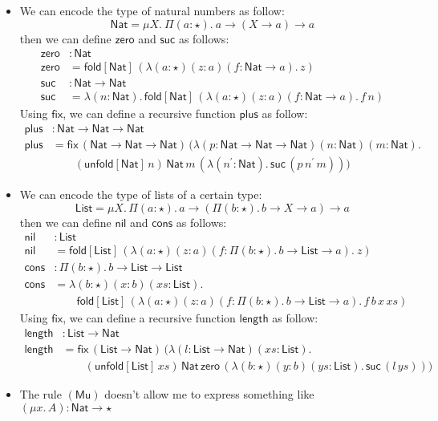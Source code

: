 \documentclass[oneside,a4paper]{article}
\theoremstyle{break}
\newcommand{\fold}[2]{\mathsf{fold}[#1]\,#2}
\newcommand{\unfold}[2]{\mathsf{unfold}[#1]\,#2}
\begin{document}
\begin{itemize}
  \newcommand{\Nat}{\mathsf{Nat}} \newcommand{\zero}{\mathsf{zero}}
  \newcommand{\suc}{\mathsf{suc}} \newcommand{\plus}{\mathsf{plus}}
  \newcommand{\List}{\mathsf{List}} \newcommand{\nil}{\mathsf{nil}}
  \newcommand{\cons}{\mathsf{cons}}
  \newcommand{\length}{\mathsf{length}}
  \newcommand{\PlFunc}{\Nat\rightarrow\Nat\rightarrow\Nat}

\item We can encode the type of natural numbers as follow:
  \[
  \Nat = \mu X.\ \Pi(a : \star).\ a \rightarrow (X \rightarrow a) \rightarrow a
  \]
  then we can define $\zero$ and $\suc$ as follows:
  \begin{align*}
    \zero &: \Nat \\
    \zero &= \fold{\Nat}{(\lambda (a : \star) (z : a) (f : \Nat \rightarrow a).\,z)}\\
    \suc &: \Nat \rightarrow \Nat\\
    \suc &= \lambda (n : \Nat).\,\fold{\Nat}{(\lambda (a : \star) (z : a) (f : \Nat \rightarrow a).\,f\,n)}
  \end{align*}
  Using $\mathsf{fix}$, we can define a recursive function $\plus$ as
  follow:
  \begin{align*}
    \plus &:\PlFunc\\
    \plus &=\mathsf{fix}\,(\PlFunc)\,(\lambda(p : \PlFunc)(n : \Nat)(m : \Nat).\\
          &\qquad (\unfold{\Nat}{n})\,\Nat\,m\,(\lambda (n^{\prime} : \Nat).\,\suc\,(p\,n^{\prime}\,m)))
  \end{align*}
\item We can encode the type of lists of a certain type:
  \[
  \List = \mu X.\,\Pi(a : \star).\,a \rightarrow (\Pi (b : \star).\,b \rightarrow X \rightarrow a) \rightarrow a
  \]
  then we can define $\nil$ and $\cons$ as follows:
  \begin{align*}
    \nil &: \List\\
    \nil &= \fold{\List}{(\lambda (a : \star) (z : a) (f : \Pi (b : \star).\,b \rightarrow \List \rightarrow a).\ z)}\\
    \cons &: \Pi (b : \star).\,b \rightarrow \List \rightarrow \List\\
    \cons &= \lambda(b : \star)(x : b)(xs : \List).\\
         &\qquad \fold{\List}{(\lambda(a : \star)(z : a)(f : \Pi (b : \star).\,b\rightarrow \List \rightarrow a).\,f\,b\,x\,xs)}
  \end{align*}
  Using $\mathsf{fix}$, we can define a recursive function $\length$
  as follow:
  \begin{align*}
    \length &: \List \rightarrow \Nat\\
    \length &= \mathsf{fix}\,(\List \rightarrow \Nat)\,(\lambda(l : \List
              \rightarrow \Nat)(xs : \List).\\
            &\qquad (\unfold{\List}{xs})\,\Nat\,\zero\,(\lambda(b : \star)(y : b)(ys : \List).\,\suc\,(l\,ys)))
  \end{align*}
\item The rule $(\mathsf{Mu})$ doesn't allow me to express something
  like $(\mu x.\,A) : \Nat \rightarrow \star$
\end{itemize}
\end{document}
